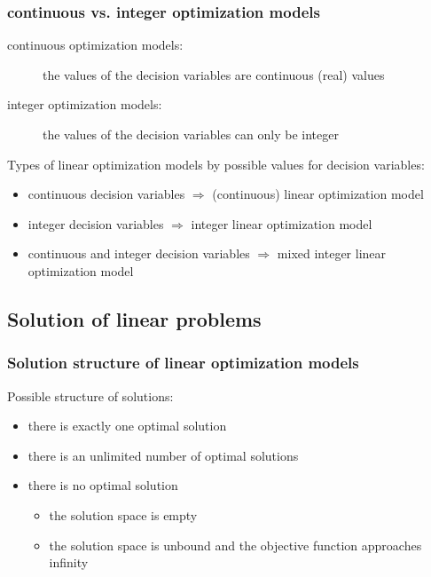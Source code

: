 \begin{frame}
 \frametitle{continuous vs. integer optimization models}
 \begin{description}
  \item[continuous optimization models:] the values of the decision variables are continuous (real) values
  \item[integer optimization models:] the values of the decision variables can only be integer
 \end{description}
 
 \begin{block}{Types of linear optimization models by possible values for decision variables:}
  \begin{itemize}\footnotesize
   \item continuous decision variables $\Longrightarrow$ (continuous) linear optimization model
   \item integer decision variables $\Longrightarrow$ integer linear optimization model
   \item continuous and integer decision variables $\Longrightarrow$ mixed integer linear optimization model
  \end{itemize}
 \end{block}
\end{frame}

\subsection{Solution of linear problems}

\begin{frame}
 \frametitle{Solution structure of linear optimization models}
 Possible structure of solutions:
 \begin{itemize}
  \item there is exactly one optimal solution
  \item there is an unlimited number of optimal solutions
  \item there is no optimal solution
  \begin{itemize}
   \item the solution space is empty
   \item the solution space is unbound and the objective function approaches infinity
  \end{itemize}
 \end{itemize}
\end{frame}


